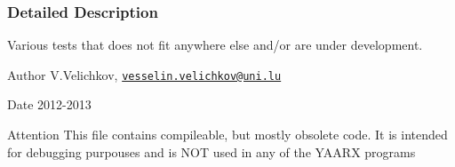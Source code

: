 \subsubsection{\-Detailed \-Description}
\-Various tests that does not fit anywhere else and/or are under development. \begin{DoxyAuthor}{\-Author}
\-V.\-Velichkov, \href{mailto:vesselin.velichkov@uni.lu}{\tt vesselin.\-velichkov@uni.\-lu} 
\end{DoxyAuthor}
\begin{DoxyDate}{\-Date}
2012-\/2013 
\end{DoxyDate}
\begin{DoxyAttention}{\-Attention}
\-This file contains compileable, but mostly obsolete code. \-It is intended for debugging purpouses and is \-N\-O\-T used in any of the \-Y\-A\-A\-R\-X programs 
\end{DoxyAttention}


